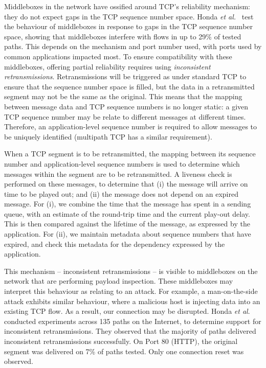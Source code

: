 \documentclass{sig-alternate-05-2015}
\begin{document}
Middleboxes in the network have ossified around TCP's reliability
mechanism: they do not expect gaps in the TCP sequence number space.
Honda \emph{et al.}\ \cite{honda:2011:extend-tcp} test the behaviour of
middleboxes in response to gaps in the TCP sequence number space, showing
that middleboxes interfere with flows in up to 29\% of tested paths. This
depends on the mechanism and port number used, with ports used by common
applications impacted most. To ensure compatibility with these middleboxes,
offering partial reliability requires using \emph{inconsistent
retransmissions}. Retransmissions will be triggered as under standard TCP
to ensure that the sequence number space is filled, but the data in a
retransmitted segment may not be the same as the original. This means that
the mapping between message data and TCP sequence numbers is no longer
static: a given TCP sequence number may be relate to different messages at
different times. Therefore, an application-level sequence number is
required to allow messages to be uniquely identified (multipath TCP has
a similar requirement).

When a TCP segment is to be retransmitted, the mapping between its
sequence number and application-level sequence numbers is used to determine
which messages within the segment are to be retransmitted. A liveness check
is performed on these messages, to determine that (i) the message will
arrive on time to be played out; and (ii) the message does not depend on an
expired message. For (i), we combine the time that the message has spent in
a sending queue, with an estimate of the round-trip time and the current
play-out delay. This is then compared against the lifetime of the message,
as expressed by the application. For (ii), we maintain metadata about
sequence numbers that have expired, and check this metadata for the
dependency expressed by the application.

This mechanism -- inconsistent retransmissions -- is visible to middleboxes
on the network that are performing payload inspection. These middleboxes
may interpret this behaviour as relating to an attack. For example, a
man-on-the-side attack exhibits similar behaviour, where a malicious host
is injecting data into an existing TCP flow. As a result, our connection
may be disrupted. Honda \emph{et al}.\ \cite{honda:2011:extend-tcp} conducted
experiments across 135 paths on the Internet, to determine support for
inconsistent retransmissions. They observed that the majority of paths
delivered inconsistent retransmissions successfully. On Port 80 (HTTP), the
original segment was delivered on 7\% of paths tested. Only one connection
reset was observed.
\end{document}
